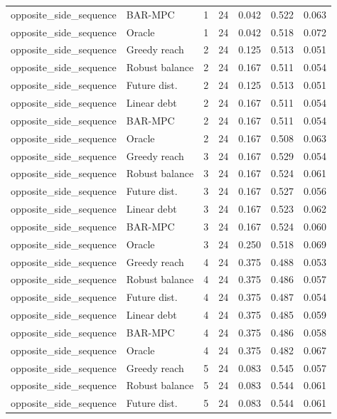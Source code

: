 \begin{longtable}{llrrrrr}
opposite\_side\_sequence & BAR-MPC & 1 & 24 & 0.042 & 0.522 & 0.063 \\
opposite\_side\_sequence & Oracle & 1 & 24 & 0.042 & 0.518 & 0.072 \\
opposite\_side\_sequence & Greedy reach & 2 & 24 & 0.125 & 0.513 & 0.051 \\
opposite\_side\_sequence & Robust balance & 2 & 24 & 0.167 & 0.511 & 0.054 \\
opposite\_side\_sequence & Future dist. & 2 & 24 & 0.125 & 0.513 & 0.051 \\
opposite\_side\_sequence & Linear debt & 2 & 24 & 0.167 & 0.511 & 0.054 \\
opposite\_side\_sequence & BAR-MPC & 2 & 24 & 0.167 & 0.511 & 0.054 \\
opposite\_side\_sequence & Oracle & 2 & 24 & 0.167 & 0.508 & 0.063 \\
opposite\_side\_sequence & Greedy reach & 3 & 24 & 0.167 & 0.529 & 0.054 \\
opposite\_side\_sequence & Robust balance & 3 & 24 & 0.167 & 0.524 & 0.061 \\
opposite\_side\_sequence & Future dist. & 3 & 24 & 0.167 & 0.527 & 0.056 \\
opposite\_side\_sequence & Linear debt & 3 & 24 & 0.167 & 0.523 & 0.062 \\
opposite\_side\_sequence & BAR-MPC & 3 & 24 & 0.167 & 0.524 & 0.060 \\
opposite\_side\_sequence & Oracle & 3 & 24 & 0.250 & 0.518 & 0.069 \\
opposite\_side\_sequence & Greedy reach & 4 & 24 & 0.375 & 0.488 & 0.053 \\
opposite\_side\_sequence & Robust balance & 4 & 24 & 0.375 & 0.486 & 0.057 \\
opposite\_side\_sequence & Future dist. & 4 & 24 & 0.375 & 0.487 & 0.054 \\
opposite\_side\_sequence & Linear debt & 4 & 24 & 0.375 & 0.485 & 0.059 \\
opposite\_side\_sequence & BAR-MPC & 4 & 24 & 0.375 & 0.486 & 0.058 \\
opposite\_side\_sequence & Oracle & 4 & 24 & 0.375 & 0.482 & 0.067 \\
opposite\_side\_sequence & Greedy reach & 5 & 24 & 0.083 & 0.545 & 0.057 \\
opposite\_side\_sequence & Robust balance & 5 & 24 & 0.083 & 0.544 & 0.061 \\
opposite\_side\_sequence & Future dist. & 5 & 24 & 0.083 & 0.544 & 0.061 \\

\end{longtable}

